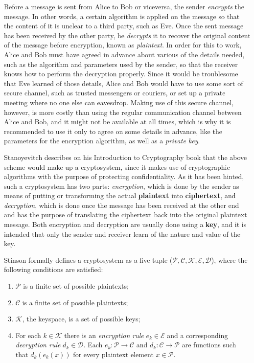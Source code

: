 Before a message is sent from Alice to Bob or viceversa, the sender \textit{encrypts} the message. In other words, a certain algorithm is applied on the message so that the content of it is unclear to a third party, such as Eve. Once the sent message has been received by the other party, he \textit{decrypts} it to recover the original content of the message before encryption, known as \textit{plaintext}. In order for this to work, Alice and Bob must have agreed in advance about various of the details needed, such as the algorithm and parameters used by the sender, so that the receiver knows how to perform the decryption properly. Since it would be troublesome that Eve learned of those details, Alice and Bob would have to use some sort of secure channel, such as trusted messengers or couriers, or set up a private meeting where no one else can eavesdrop. Making use of this secure channel, however, is more costly than using the regular communication channel between Alice and Bob, and it might not be available at all times, which is why it is recommended to use it only to agree on some details in advance, like the parameters for the encryption algorithm, as well as a \textit{private key}.

Stanoyevitch describes on his Introduction to Cryptography \cite{IntroCryptoMath} book that the above scheme would make up a cryptosystem, since it makes use of cryptographic algorithms with the purpose of protecting confidentiality. As it has been hinted, such a cryptosystem has two parts: \emph{encryption}, which is done by the sender as means of putting or transforming the actual \textbf{plaintext} into \textbf{ciphertext}, and \emph{decryption}, which is done once the message has been received at the other end and has the purpose of translating the ciphertext back into the original plaintext message. Both encryption and decryption are usually done using a \textbf{key}, and it is intended that only the sender and receiver learn of the nature and value of the key. 

Stinson \cite{stinson2005cryptography} formally defines a cryptosystem as a five-tuple ($\mathcal{P}, \mathcal{C}, \mathcal{K}, \mathcal{E}, \mathcal{D}$), where the following conditions are satisfied:
\begin{enumerate}
\item $\mathcal{P}$ is a finite set of possible plaintexts;
\item $\mathcal{C}$ is a finite set of possible plaintexts;
\item $\mathcal{K}$, the keyspace, is a set of possible keys;
\item For each $k \in \mathcal{K}$ there is an \textit{encryption rule} $ e_{k} \in \mathcal{E}$  and a corresponding \textit{decryption rule} $ d_{k} \in \mathcal{D}$. Each $e_{k}: \mathcal{P} \rightarrow \mathcal{C}$ and $d_{k}: \mathcal{C} \rightarrow \mathcal{P}$ are functions such that $d_{k}(e_{k}(x))$ for every plaintext element $x \in \mathcal{P}$.
\end{enumerate}

